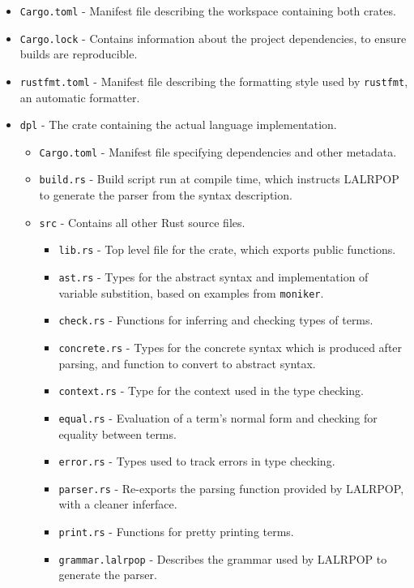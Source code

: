 \documentclass[12pt,a4paper,twoside]{report}
\begin{document}
\begin{itemize}
    \item \texttt{Cargo.toml} - Manifest file describing the workspace containing both crates.
    \item \texttt{Cargo.lock} - Contains information about the project dependencies, to ensure builds are reproducible.
    \item \texttt{rustfmt.toml} - Manifest file describing the formatting style used by \texttt{rustfmt}, an automatic formatter.
    \item \texttt{dpl} - The crate containing the actual language implementation.
    \begin{itemize}
        \item \texttt{Cargo.toml} - Manifest file specifying dependencies and other metadata.
        \item \texttt{build.rs} - Build script run at compile time, which instructs LALRPOP to generate the parser from the syntax description.
        \item \texttt{src} - Contains all other Rust source files.
        \begin{itemize}
            \item \texttt{lib.rs} - Top level file for the crate, which exports public functions.
            \item \texttt{ast.rs} - Types for the abstract syntax and implementation of variable substition, based on examples from \texttt{moniker}.
            \item \texttt{check.rs} - Functions for inferring and checking types of terms.
            \item \texttt{concrete.rs} - Types for the concrete syntax which is produced after parsing, and function to convert to abstract syntax.
            \item \texttt{context.rs} - Type for the context used in the type checking.
            \item \texttt{equal.rs} - Evaluation of a term's normal form and checking for equality between terms.
            \item \texttt{error.rs} - Types used to track errors in type checking.
            \item \texttt{parser.rs} - Re-exports the parsing function provided by LALRPOP, with a cleaner inferface.
            \item \texttt{print.rs} - Functions for pretty printing terms.
            \item \texttt{grammar.lalrpop} - Describes the grammar used by LALRPOP to generate the parser.

\end{itemize}
\end{itemize}
\end{itemize}
\end{document}
